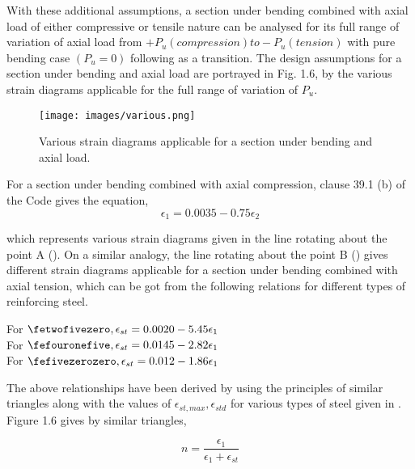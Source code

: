 With these additional assumptions, a section under bending combined with
axial load of either compressive or tensile nature can be analysed for
its full range of variation of axial load from
$+P_u(compression) to -P_u (tension)$ with pure bending case $(P_u=0)$
following as a transition. The design assumptions for a section under
bending and axial load are portrayed in Fig. 1.6, by the various strain
diagrams applicable for the full range of variation of $P_u$.

\begin{figure}
\centering
\texttt{[image: images/various.png]}
\caption{Various strain diagrams applicable for a section under bending and axial load.}
\label{fig:various}
\end{figure}

For a section under bending combined with axial compression, clause 39.1 (b) of the Code gives the equation,
\begin{equation}
\epsilon_1=0.0035-0.75\epsilon_2
\end{equation}

which represents various strain diagrams given in the line rotating about
the point A (). On a similar analogy, the line rotating about the
point B () gives different strain diagrams applicable for a
section under bending combined with axial tension, which can be got from
the following relations for different types of reinforcing steel.

\begin{center}
For $\fetwofivezero,\epsilon_{st}=0.0020-5.45\epsilon_1$\\
For $\fefouronefive,\epsilon_{st}=0.0145-2.82\epsilon_1$\\
For $\fefivezerozero,\epsilon_{st}=0.012-1.86\epsilon_1$
\end{center}

The above relationships have been derived by using the principles of
similar triangles along with the values of $\epsilon_{st,max}, \epsilon_{std}$ for
various types of steel given in . Figure 1.6 gives by
similar triangles,

\begin{equation}
n=\frac{\epsilon_1}{\epsilon_1+\epsilon_{st}}
\end{equation}

